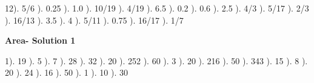 \documentclass{article}%
\begin{document}
12). 5/6%
). 0.25%
). 1.0%
). 10/19%
). 4/19%
). 6.5%
). 0.2%
). 0.6%
). 2.5%
). 4/3%
). 5/17%
). 2/3%
). 16/13%
). 3.5%
). 4%
). 5/11%
). 0.75%
). 16/17%
). 1/7%
\newline%
\newpage%
\large%
\begin{center}%
\textbf{Area- Solution 1}%
\newline%
\end{center} \normalsize%
1). 19%
). 5%
). 7%
). 28%
). 32%
). 20%
). 252%
). 60%
). 3%
). 20%
). 216%
). 50%
). 343%
). 15%
). 8%
). 20%
). 24%
). 16%
). 50%
). 1%
). 10%
). 30%
\end{document}
